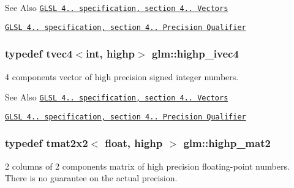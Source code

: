 \begin{DoxySeeAlso}{See Also}
\href{http://www.opengl.org/registry/doc/GLSLangSpec.4.20.8.pdf}{\tt G\-L\-S\-L 4.. specification, section 4.. Vectors} 

\href{http://www.opengl.org/registry/doc/GLSLangSpec.4.20.8.pdf}{\tt G\-L\-S\-L 4.. specification, section 4.. Precision Qualifier} 
\end{DoxySeeAlso}
\hypertarget{group__core__precision_ga9303c2a9e1f1e761961eeecbcda2d34f}{
\subsubsection[{highp\-\_\-ivec4}]{\setlength{\rightskip}{0pt plus 5cm}typedef tvec4$<$int, highp$>$ {\bf glm\-::highp\-\_\-ivec4}}}\label{group__core__precision_ga9303c2a9e1f1e761961eeecbcda2d34f}
4 components vector of high precision signed integer numbers.

\begin{DoxySeeAlso}{See Also}
\href{http://www.opengl.org/registry/doc/GLSLangSpec.4.20.8.pdf}{\tt G\-L\-S\-L 4.. specification, section 4.. Vectors} 

\href{http://www.opengl.org/registry/doc/GLSLangSpec.4.20.8.pdf}{\tt G\-L\-S\-L 4.. specification, section 4.. Precision Qualifier} 
\end{DoxySeeAlso}
\hypertarget{group__core__precision_ga8539ada9351e0a74964fa23c040246cf}{
\subsubsection[{highp\-\_\-mat2}]{\setlength{\rightskip}{0pt plus 5cm}typedef tmat2x2$<$ float, highp $>$ {\bf glm\-::highp\-\_\-mat2}}}\label{group__core__precision_ga8539ada9351e0a74964fa23c040246cf}
2 columns of 2 components matrix of high precision floating-\/point numbers. There is no guarantee on the actual precision.

